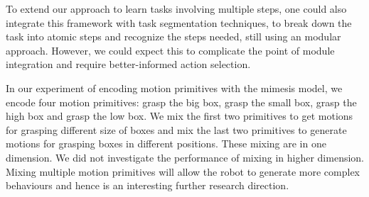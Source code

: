 To extend our approach to learn tasks involving multiple steps, one
could also integrate this framework with task segmentation techniques,
to break down the task into atomic steps and recognize the steps
needed, still using an modular approach. However, we could expect this
to complicate the point of module integration and require
better-informed action selection.

In our experiment of encoding motion primitives with the mimesis model, we encode four motion primitives: grasp the big box, grasp the small box, grasp the high box and grasp the low box. We mix the first two primitives to get motions for grasping different size of boxes and mix the last two primitives to generate motions for grasping boxes in different positions. These mixing are in one dimension. We did not investigate the performance of mixing in higher dimension. Mixing multiple motion primitives will allow the robot to generate more complex behaviours and hence is an interesting further research direction.

%
%
%
%
%

